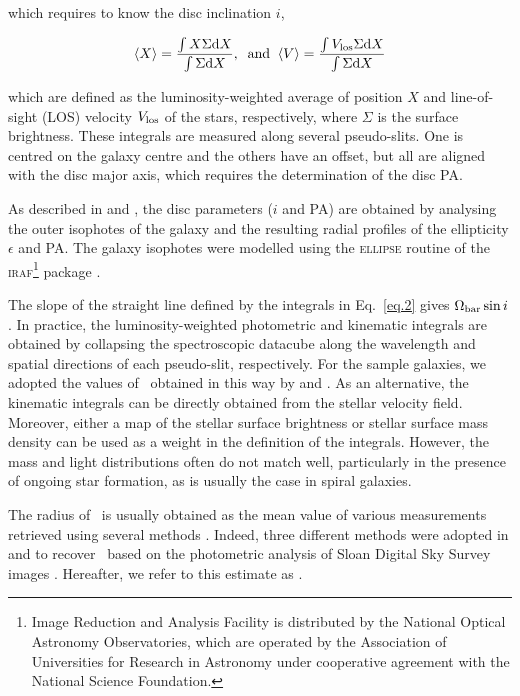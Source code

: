 \documentclass{aa}
\begin{document}
\noindent which requires to know the disc inclination $i$,

\begin{equation}
\langle X\rangle=\frac{\int X \Sigma {\rm d}X}{\int \Sigma {\rm d}X} ,\;\;{\rm and}\;\; \langle V\rangle=\frac{\int V_{\rm los}\Sigma {\rm d}X}{\int \Sigma {\rm d}X}
\label{eq.2}
\end{equation}

\noindent which are defined as the luminosity-weighted average of position $X$ and line-of-sight (LOS) velocity $V_{\rm los}$ of the stars, respectively, where $\Sigma$ is the surface brightness. These integrals are measured along several pseudo-slits. One is centred on the galaxy centre and the others have an offset, but all are aligned with the disc major axis, which requires the determination of the disc PA. 

As described in \citet{Aguerri2015} and \citet{Cuomo2019b}, the disc parameters ($i$ and PA) are obtained by analysing the outer isophotes of the galaxy and the resulting radial profiles of the ellipticity $\epsilon$ and PA. The galaxy isophotes were modelled using the \textsc{ellipse} routine of the \textsc{iraf\footnote{Image Reduction and Analysis Facility is distributed by the National Optical Astronomy Observatories,
which are operated by the Association of Universities for Research in Astronomy under cooperative agreement with the National Science Foundation.}} package \citep{Jedrzejewski1987}. 

The slope of the straight line defined by the integrals in Eq.~\ref{eq.2} gives $\Omega_{\rm bar}\sin i$. In practice, the luminosity-weighted photometric and kinematic integrals are obtained by collapsing the spectroscopic datacube along the wavelength and spatial directions of each pseudo-slit, respectively. For the sample galaxies, we adopted the values of \omegabar\ obtained in this way by \citet[][see col. 4 in their Table 3]{Aguerri2015} and \citet[][see col. 3 in their Table 2]{Cuomo2019b}. As an alternative, the kinematic integrals can be directly obtained from the stellar velocity field. Moreover, either a map of the stellar surface brightness \citep{Aguerri2015,Guo2019,Garma-Oehmichen2020} or stellar surface mass density \citep{Aguerri2015,Guo2019,Williams2021} can be used as a weight in the definition of the integrals. However, the mass and light distributions often do not match well, particularly in the presence of ongoing star formation, as is usually the case in spiral galaxies.

The radius of \rbar\ is usually obtained as the mean value of various measurements retrieved using several methods \citep{Corsini2003,Cuomo2019,Guo2019}. Indeed, three different methods were adopted in \citet{Aguerri2015} and \citet{Cuomo2019b} to recover \rbar\ based on the photometric analysis of Sloan Digital Sky Survey images \citep[SDSS;][]{Abazajian2009}. Hereafter, we refer to this estimate as \rmean. 
\end{document}
